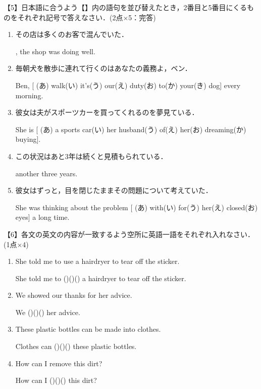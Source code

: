 \noindent 【5】日本語に合うよう【\quad\quad】内の語句を並び替えたとき，2番目と5番目にくるものをそれぞれ記号で答えなさい．(2点$\times$5：完答)
\begin{enumerate}
  \item その店は多くのお客で混んでいた．
  \par [ (あ) a lot\quad(い) customers\quad(う) with\quad(え) of\quad(お) crowded], the shop was doing well.
  \item 毎朝犬を散歩に連れて行くのはあなたの義務よ，ベン．
  \par Ben, [ (あ) walk\quad(い) it's\quad(う) our\quad(え) duty\quad(お) to\quad(か) your\quad(き) dog] every morning. 
  \item 彼女は夫がスポーツカーを買ってくれるのを夢見ている．
  \par She is [ (あ) a sports car\quad(い) her husband\quad(う) of\quad(え) her\quad(お) dreaming\quad(か) buying]. 
  \item この状況はあと3年は続くと見積もられている．
  \par [ (あ) last\quad(い) that\quad(う) is\quad(え) estimated\quad(お) this situation\quad(か) will\quad(き) it] another three years. 
  \item 彼女はずっと，目を閉じたままその問題について考えていた．
  \par She was thinking about the problem [ (あ) with\quad(い) for\quad(う) her\quad(え) closed\quad(お) eyes] a long time. 
\end{enumerate}
\bigskip\bigskip

\noindent 【6】各文の英文の内容が一致するよう空所に英語一語をそれぞれ入れなさい．(1点$\times$4)
\begin{enumerate}
  \item She told me to use a hairdryer to tear off the sticker. 
  \par She told me to (\qquad)(\qquad)(\qquad) a hairdryer to tear off the sticker. 
  \item We showed our thanks for her advice.
  \par We (\qquad)(\qquad)(\qquad) her advice. 
  \item These plastic bottles can be made into clothes.
  \par Clothes can (\qquad)(\qquad)(\qquad) these plastic bottles. 
  \item How can I remove this dirt?
  \par How can I (\qquad)(\qquad)(\qquad) this dirt?
\end{enumerate}
\bigskip\bigskip

